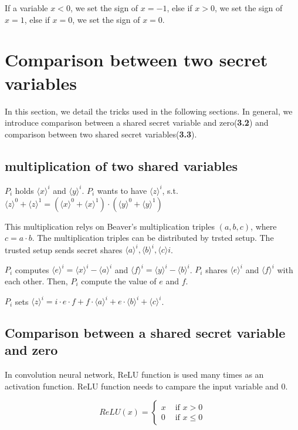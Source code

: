 \documentclass[11pt,twoside,a4paper]{article}
\begin{document}
If a variable $x<0$, we set the sign of $x=-1$, else if $x>0$, we set the sign of $x=1$, else if $x=0$, we set the sign of $x=0$.

\section{Comparison between two secret variables}
In this section, we detail the tricks used in the following sections. 
In general, we introduce comparison between a shared secret variable and zero(\textbf{3.2}) 
and comparison between two shared secret variables(\textbf{3.3}).

\subsection{multiplication of two shared variables}

$P_{i}$ holds $\langle x\rangle ^{i}$ and $\langle y\rangle ^{i}$.
$P_{i}$ wants to have $\langle z\rangle ^{i}$, 
s.t. $\langle z\rangle ^{0}+\langle z\rangle ^{1}=(\langle x\rangle ^{0}+\langle x\rangle ^{1})
\cdot (\langle y\rangle ^{0}+\langle y\rangle ^{1})$

This multiplication relys on Beaver’s multiplication triples $(a,b,c)$, where $c=a \cdot b$. 
The multiplication triples can be distributed by trsted setup. 
The trusted setup sends secret shares $\langle a\rangle ^{i},\langle b\rangle ^{i},\langle c\rangle {i}$.

$P_{i}$ computes $\langle e\rangle ^{i}=\langle x\rangle ^{i}-\langle a\rangle ^{i}$ and $\langle f\rangle ^{i}=\langle y\rangle ^{i}-\langle b\rangle ^{i}$.
$P_{i}$ shares $\langle e\rangle^{i}$ and $\langle f\rangle^{i}$ with each other. Then, $P_{i}$ compute the value of $e$ and $f$.

$P_{i}$ sets $\langle z\rangle^{i}=i\cdot e \cdot f + f\cdot \langle a\rangle^{i}+e \cdot \langle b\rangle^{i} + \langle c\rangle^{i}$.

\subsection{Comparison between a shared secret variable and zero}

In convolution neural network, ReLU function is used many times as an activation function. ReLU function needs to campare the input variable and 0.

$$ReLU(x)=\begin{cases}
	x & \text{ if } x > 0 \\ 
	0 & \text{ if } x \leqslant 0  
	\end{cases}$$
\end{document}
